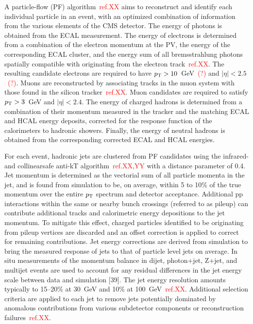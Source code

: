 \documentclass{cernatlasnote}
\newcommand{\pt}{$p_{\text T}$\xspace}
\begin{document}
A particle-flow (PF) algorithm~\textcolor{red}{ref.XX} aims to reconstruct and identify each individual particle in an event, with an optimized combination of information from the various elements of the CMS detector. 
The energy of photons is obtained from the ECAL measurement. The energy of electrons is determined from a combination of the electron momentum at the PV, the energy of the corresponding ECAL cluster, and the energy sum of all bremsstrahlung photons spatially compatible with originating from the electron track~\textcolor{red}{ref.XX}. The resulting candidate electrons are required to have $p_{\rm T} > 10$~GeV~\textcolor{red}{(?)} and $|\eta| < 2.5$~\textcolor{red}{(?)}. 
Muons are reconstructed by associating tracks in the muon system with those found in the silicon tracker~\textcolor{red}{ref.XX}. Muon candidates are required to satisfy $p_{\rm T} > 3$~GeV and $|\eta| < 2.4$.
The energy of charged hadrons is determined from a combination of their momentum measured in the tracker and the matching ECAL and HCAL energy deposits, corrected for the response function of the calorimeters to hadronic showers. Finally, the energy of neutral hadrons is obtained from the corresponding corrected ECAL and HCAL energies.

For each event, hadronic jets are clustered from PF candidates using the infrared- and collinearsafe anti-kT algorithm~\textcolor{red}{ref.XX,YY} with a distance parameter of 0.4. Jet momentum is determined as the vectorial sum of all particle momenta in the jet, and is found from simulation to be, on average, within 5 to 10\% of the true momentum over the entire \pt spectrum and detector acceptance. Additional pp interactions within the same or nearby bunch crossings (referred to as pileup) can contribute additional tracks and calorimetric energy depositions to the jet momentum. To mitigate this effect, charged particles identified to be originating from pileup vertices are discarded and an offset correction is applied to correct for remaining contributions. Jet energy corrections are derived from simulation to bring the measured response of jets to that of particle level jets on average. In situ measurements of the momentum balance in dijet, photon+jet, Z+jet, and multijet events are used to account for any residual differences in the jet energy scale between data and simulation [39]. The jet energy resolution amounts typically to 15–20\% at 30~GeV and 10\% at 100~GeV~\textcolor{red}{ref.XX}. Additional selection criteria are applied to each jet to remove jets potentially dominated by anomalous contributions from various subdetector components or reconstruction failures~\textcolor{red}{ref.XX}.
\end{document}
